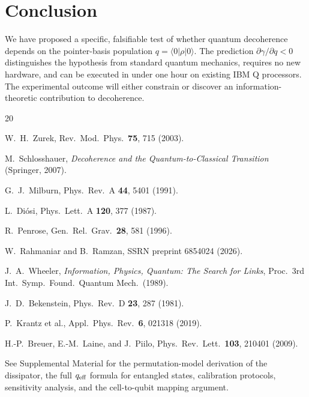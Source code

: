 \documentclass[aps,prl,twocolumn,superscriptaddress,hyperref]{revtex4-2}
\begin{document}
\section{Conclusion}

We have proposed a specific, falsifiable test of whether quantum decoherence depends on the pointer-basis population $q = \langle 0|\rho|0\rangle$. The prediction $\partial\gamma/\partial q < 0$ distinguishes the hypothesis from standard quantum mechanics, requires no new hardware, and can be executed in under one hour on existing IBM Q processors. The experimental outcome will either constrain or discover an information-theoretic contribution to decoherence.

\begin{thebibliography}{20}

W.~H.~Zurek, Rev.\ Mod.\ Phys.\ \textbf{75}, 715 (2003).

M.~Schlosshauer, \emph{Decoherence and the Quantum-to-Classical Transition} (Springer, 2007).

G.~J.~Milburn, Phys.\ Rev.\ A \textbf{44}, 5401 (1991).

L.~Di\'osi, Phys.\ Lett.\ A \textbf{120}, 377 (1987).

R.~Penrose, Gen.\ Rel.\ Grav.\ \textbf{28}, 581 (1996).

W.~Rahmaniar and B.~Ramzan, SSRN preprint 6854024 (2026).

J.~A.~Wheeler, \emph{Information, Physics, Quantum: The Search for Links}, Proc.\ 3rd Int.\ Symp.\ Found.\ Quantum Mech.\ (1989).

J.~D.~Bekenstein, Phys.\ Rev.\ D \textbf{23}, 287 (1981).

P.~Krantz et al., Appl.\ Phys.\ Rev.\ \textbf{6}, 021318 (2019).

H.-P.~Breuer, E.-M.~Laine, and J.~Piilo, Phys.\ Rev.\ Lett.\ \textbf{103}, 210401 (2009).

See Supplemental Material for the permutation-model derivation of the dissipator, the full $q_{\rm eff}$ formula for entangled states, calibration protocols, sensitivity analysis, and the cell-to-qubit mapping argument.

\end{thebibliography}
\end{document}
